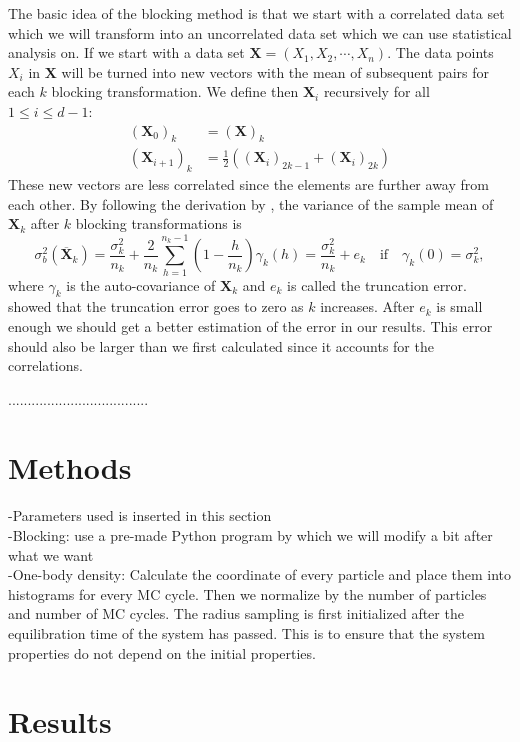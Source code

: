 \documentclass[12pt,a4paper,english]{article}
\begin{document}
The basic idea of the blocking method is that we start with a correlated data set which we will transform into an uncorrelated data set which we can use statistical analysis on. If we start with a data set $\textbf{X}=(X_1,X_2,\cdots,X_n)$. The data points $X_i$ in $\textbf{X}$ will be turned into new vectors with the mean of subsequent pairs for each $k$ blocking transformation. We define then $\textbf{X}_i$ recursively for all $1\leq i \leq d-1$:
\begin{align*}
(\textbf{X}_0)_k&=(\textbf{X})_k\\
(\textbf{X}_{i+1})_k&=\frac{1}{2}\left((\textbf{X}_i)_{2k-1}+(\textbf{X}_i)_{2k}\right)
\end{align*}
These new vectors are less correlated since the elements are further away from each other. By following the derivation by \citet{jonsson2018standard}, the variance of the sample mean of $\textbf{X}_k$ after $k$ blocking transformations is
\begin{equation}
\label{eq:blocking_var}
\sigma^2_b(\overline{\textbf{X}}_k)=\frac{\sigma_k^2}{n_k}+\frac{2}{n_k}\sum_{h=1}^{n_k-1}\left(1-\frac{h}{n_k}\right)\gamma_k(h)=\frac{\sigma_k^2}{n_k}+e_k\quad \text{if}\quad \gamma_k(0)=\sigma_k^2,
\end{equation}
where $\gamma_k$ is the auto-covariance of $\textbf{X}_k$ and $e_k$ is called the truncation error. \citet{flyvbjerg1989error} showed that the truncation error goes to zero as $k$ increases. After $e_k$ is small enough we should get a better estimation of the error in our results. This error should also be larger than we first calculated since it accounts for the correlations.

....................................
\section{Methods}
\label{sect:Methods}
-Parameters used is inserted in this section\\
-Blocking: use a pre-made Python program by \citet{jonsson2018standard} which we will modify a bit after what we want\\
-One-body density: Calculate the coordinate of every particle and place them into histograms for every MC cycle. Then we normalize by the number of particles and number of MC cycles. The radius sampling is first initialized after the equilibration time of the system has passed. This is to ensure that the system properties do not depend on the initial properties. 
\section{Results}
\label{sect:Results}
\end{document}
